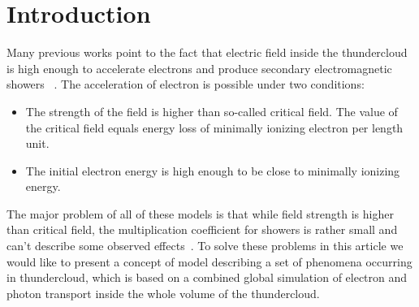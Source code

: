 \documentclass[%
 aip,
cp,  %
 amsmath,amssymb,%
 reprint,%
]{revtex4-2}
\begin{document}
\section{Introduction}
Many previous works point to the fact that electric field inside the thundercloud is high enough to accelerate electrons and produce secondary electromagnetic showers ~\cite{gurevich1992runaway, gurevich1999lightning,dwyer2003fundamental,dwyer2011low,gurevich2001kinetic,dwyer2015positron, dwyer2013properties}.
The acceleration of electron is possible under two conditions:
\begin{itemize}
    \item The strength of the field is higher than so-called critical field. The value of the critical field equals energy loss of minimally ionizing electron per length unit.
    \item The initial electron energy is high enough to be close to minimally ionizing energy.
\end{itemize}
The major problem of all of these models is that while field strength is higher than critical field, the multiplication coefficient for showers is rather small and can’t describe some observed effects~\cite{npm_dwyer, Stadnichuk}. To solve these problems in this article we would like to present a concept of model describing a set of phenomena occurring in thundercloud, which is based on a combined global simulation of electron and photon transport inside the whole volume of the thundercloud.
\end{document}
